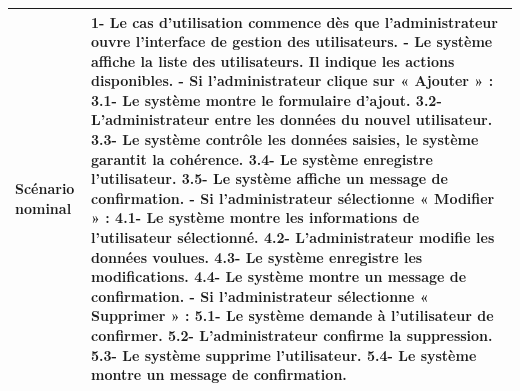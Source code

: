 \begin{table}[H]
\begin{tabularx}{\textwidth}{|p{4.5cm}|X|}
		\textbf{Scénario nominal}
		&
		1- Le cas d’utilisation commence dès que l’administrateur ouvre l’interface de gestion des utilisateurs. \newline
		2- Le système affiche la liste des utilisateurs. Il indique les actions disponibles. \newline
		3- Si l’administrateur clique sur « Ajouter » : \newline
		\hspace*{0.5cm}3.1- Le système montre le formulaire d’ajout. \newline
		\hspace*{0.5cm}3.2- L’administrateur entre les données du nouvel utilisateur. \newline
		\hspace*{0.5cm}3.3- Le système contrôle les données saisies, le système garantit la cohérence. \newline
		\hspace*{0.5cm}3.4- Le système enregistre l’utilisateur. \newline
		\hspace*{0.5cm}3.5- Le système affiche un message de confirmation. \newline
		4- Si l’administrateur sélectionne « Modifier » : \newline
		\hspace*{0.5cm}4.1- Le système montre les informations de l’utilisateur sélectionné. \newline
		\hspace*{0.5cm}4.2- L’administrateur modifie les données voulues. \newline
		\hspace*{0.5cm}4.3- Le système enregistre les modifications. \newline
		\hspace*{0.5cm}4.4- Le système montre un message de confirmation. \newline
		5- Si l’administrateur sélectionne « Supprimer » : \newline
		\hspace*{0.5cm}5.1- Le système demande à l’utilisateur de confirmer. \newline
		\hspace*{0.5cm}5.2- L’administrateur confirme la suppression. \newline
		\hspace*{0.5cm}5.3- Le système supprime l’utilisateur. \newline
		\hspace*{0.5cm}5.4- Le système montre un message de confirmation. \\ \hline
		

\end{tabularx}
\end{table}
